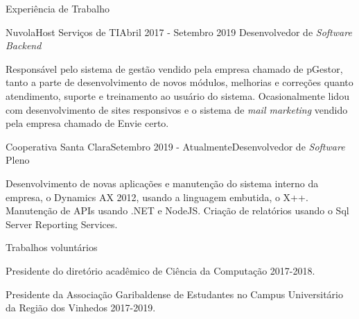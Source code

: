 \documentclass{resume} %
\begin{document}
\begin{rSection}{Experi\^encia de Trabalho}

\begin{rSubsection}{NuvolaHost Servi\c{c}os de TI}{Abril 2017 - Setembro 2019 }{Desenvolvedor de \textit{Software Backend}}{}
\item Respons\'avel pelo sistema de gest\~ao vendido pela empresa chamado de pGestor, tanto a parte de desenvolvimento de novos m\'odulos, melhorias e corre\c{c}\~oes quanto  atendimento, suporte e treinamento ao usu\'ario do sistema. Ocasionalmente lidou com desenvolvimento de sites responsivos e o sistema de \textit{mail marketing} vendido pela empresa chamado de Envie certo.
\end{rSubsection}

\begin{rSubsection}{Cooperativa Santa Clara}{Setembro 2019 - Atualmente}{Desenvolvedor de \textit{Software} Pleno}{}
\item Desenvolvimento de novas aplica\c{c}\~oes e manuten\c{c}\~ao do sistema interno da empresa, o Dynamics AX 2012, usando a linguagem embutida, o X++. Manuten\c{c}\~ao de APIs usando .NET e NodeJS. Cria\c{c}\~ao de relat\'{o}rios usando o Sql Server Reporting Services.
\end{rSubsection}

\end{rSection}


\begin{rSection}{Trabalhos volunt\'arios} 
\item Presidente do diret\'orio acad\^emico de Ci\^encia da Computa\c{c}\~ao 2017-2018.
\item Presidente da Associa\c{c}\~ao Garibaldense de Estudantes no Campus Universit\'ario da Regi\~ao dos Vinhedos 2017-2019.
\end{rSection}
\end{document}
